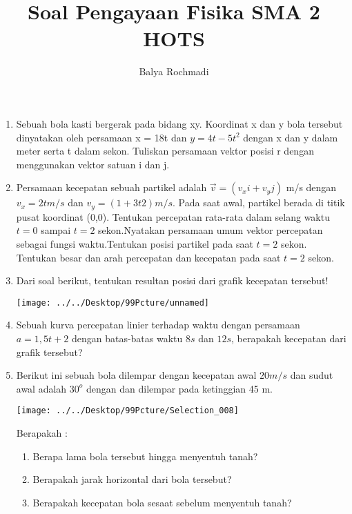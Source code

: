 \documentclass[12pt,a4paper,draft,final,oneside,twoside,openright,openany]{article}
\author{Balya Rochmadi}
\title{Soal Pengayaan Fisika SMA 2 HOTS}
\begin{document}
	\maketitle
	\begin{enumerate}
		\item Sebuah bola kasti bergerak pada bidang xy. Koordinat x dan y bola tersebut dinyatakan oleh persamaan x = 18t dan $y=4t-5t^2$ dengan x dan y dalam meter serta t dalam sekon. Tuliskan persamaan vektor posisi r dengan menggunakan vektor satuan i dan j.
		\item Persamaan kecepatan sebuah partikel adalah $\vec{v} = (v_xi+ v_yj)$ m/s dengan $v_x = 2t m/s$ dan $v_y = (1+ 3t2) m/s$. Pada saat awal, partikel berada di titik pusat koordinat (0,0).
		Tentukan percepatan rata-rata dalam selang waktu $t = 0$ sampai $t = 2$ sekon.Nyatakan persamaan umum vektor percepatan sebagai fungsi waktu.Tentukan posisi partikel pada saat $t = 2$ sekon.
		Tentukan besar dan arah percepatan dan kecepatan pada saat $t = 2$ sekon.
		\item Dari soal berikut, tentukan resultan posisi dari grafik kecepatan tersebut!
		\begin{center}
		\texttt{[image: ../../Desktop/99Pcture/unnamed]}
		\end{center}
		\item Sebuah kurva percepatan linier terhadap waktu dengan persamaan $a=1,5t+2$ dengan batas-batas waktu $8s$ dan $12s$, berapakah kecepatan dari grafik tersebut?
		\item Berikut ini sebuah bola dilempar dengan kecepatan awal $20m/s$ dan sudut awal adalah $30^o$ dengan dan dilempar pada ketinggian 45 m.\\
		\begin{center}
		\texttt{[image: ../../Desktop/99Pcture/Selection\_008]}
		\end{center}
		Berapakah :
		\begin{enumerate}
			\item Berapa lama bola tersebut hingga menyentuh tanah?
			\item Berapakah jarak horizontal dari bola tersebut?
			\item Berapakah kecepatan bola sesaat sebelum menyentuh tanah?
		\end{enumerate}
\end{enumerate}
\end{document}
